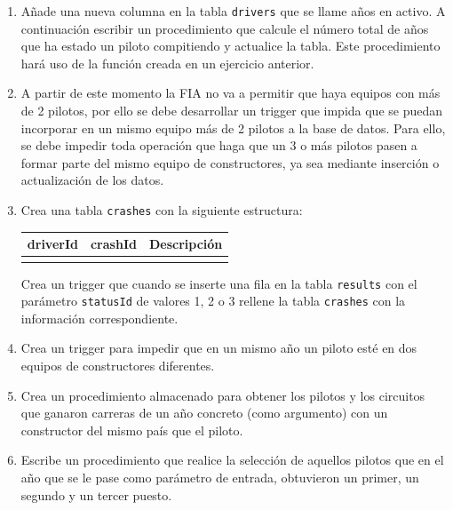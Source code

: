 \documentclass[a4paper]{article}
\begin{document}
\begin{enumerate}
    \item Añade una nueva columna en la tabla \texttt{drivers} que se llame años en activo. A continuación escribir un procedimiento que calcule el número total de años que ha estado un piloto compitiendo y actualice la tabla. Este procedimiento hará uso de la función creada en un ejercicio anterior.
    
    \item A partir de este momento la FIA no va a permitir que haya equipos con más de 2 pilotos, por ello se debe desarrollar un trigger que impida que se puedan incorporar en un mismo equipo más de 2 pilotos a la base de datos. Para ello, se debe impedir toda operación que haga que un 3 o más pilotos pasen a formar parte del mismo equipo de constructores, ya sea mediante inserción o actualización de los datos. 
            
    \item Crea una tabla \texttt{crashes} con la siguiente estructura:
    \begin{table}[h]
    \centering
    \begin{tabular}{@{}lll@{}}
    \toprule
    \multicolumn{1}{c}{\textbf{driverId}} & \multicolumn{1}{c}{\textbf{crashId}} & \multicolumn{1}{c}{\textbf{Descripción}} \\ \midrule
                                          &                                      &                                          \\ \bottomrule
    \end{tabular}
    \end{table}

    Crea un trigger que cuando se inserte una fila en la tabla \texttt{results} con el parámetro \texttt{statusId} de valores 1, 2 o 3 rellene la tabla \texttt{crashes} con la información correspondiente.

    \item Crea un trigger para impedir que en un mismo año un piloto esté en dos equipos de constructores diferentes.
         
    \item Crea un procedimiento almacenado para obtener los pilotos y los circuitos que ganaron carreras de un año concreto (como argumento) con un constructor del mismo país que el piloto.

    \item Escribe un procedimiento que realice la selección de aquellos pilotos que en el año que se le pase como parámetro de entrada, obtuvieron un primer, un segundo y un tercer puesto.
        

\end{enumerate}
\end{document}
